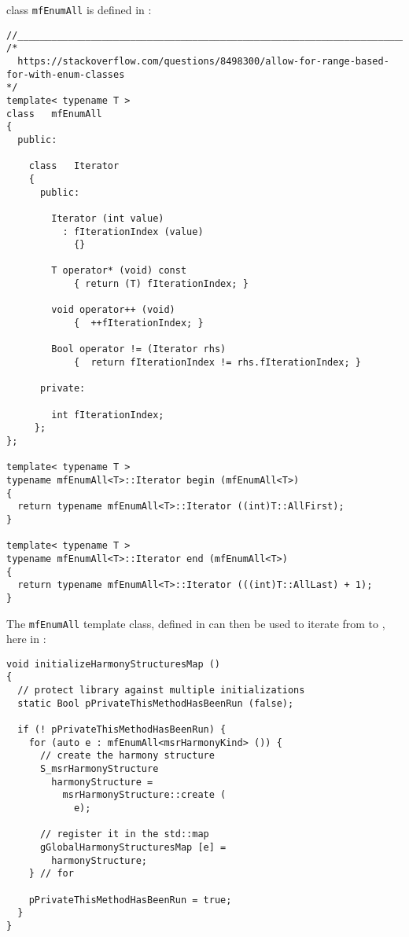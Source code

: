 class   {\tt mfEnumAll} is defined in :
\begin{lstlisting}[language=CPlusPlus]
//______________________________________________________________________________
/*
  https://stackoverflow.com/questions/8498300/allow-for-range-based-for-with-enum-classes
*/
template< typename T >
class   mfEnumAll
{
  public:

    class   Iterator
    {
      public:

        Iterator (int value)
          : fIterationIndex (value)
            {}

        T operator* (void) const
            { return (T) fIterationIndex; }

        void operator++ (void)
            {  ++fIterationIndex; }

        Bool operator != (Iterator rhs)
            {  return fIterationIndex != rhs.fIterationIndex; }

      private:

        int fIterationIndex;
     };
};

template< typename T >
typename mfEnumAll<T>::Iterator begin (mfEnumAll<T>)
{
  return typename mfEnumAll<T>::Iterator ((int)T::AllFirst);
}

template< typename T >
typename mfEnumAll<T>::Iterator end (mfEnumAll<T>)
{
  return typename mfEnumAll<T>::Iterator (((int)T::AllLast) + 1);
}
\end{lstlisting}

The {\tt mfEnumAll} template class, defined in  can then be used to iterate from  to , here in :
\begin{lstlisting}[language=CPlusPlus]
void initializeHarmonyStructuresMap ()
{
  // protect library against multiple initializations
  static Bool pPrivateThisMethodHasBeenRun (false);

  if (! pPrivateThisMethodHasBeenRun) {
    for (auto e : mfEnumAll<msrHarmonyKind> ()) {
      // create the harmony structure
      S_msrHarmonyStructure
        harmonyStructure =
          msrHarmonyStructure::create (
            e);

      // register it in the std::map
      gGlobalHarmonyStructuresMap [e] =
        harmonyStructure;
    } // for

    pPrivateThisMethodHasBeenRun = true;
  }
}
\end{lstlisting}


